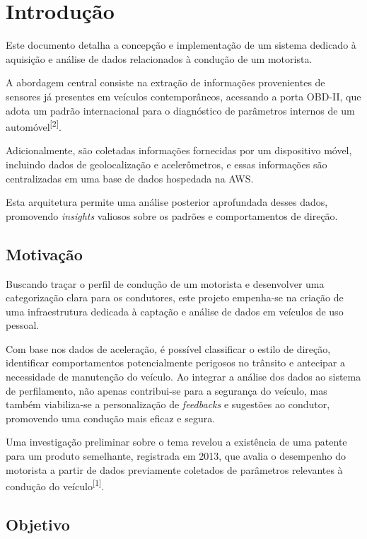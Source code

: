 \chapter{Introdução}\label{CAP:introducao}

Este documento detalha a concepção e implementação de um sistema dedicado à aquisição e análise de dados relacionados à condução de um motorista.

A abordagem central consiste na extração de informações provenientes de sensores já presentes em veículos contemporâneos, acessando a porta OBD-II, que adota um padrão internacional para o diagnóstico de parâmetros internos de um automóvel\textsuperscript{[2]}.

Adicionalmente, são coletadas informações fornecidas por um dispositivo móvel, incluindo dados de geolocalização e acelerômetros, e essas informações são centralizadas em uma base de dados hospedada na AWS. 

Esta arquitetura permite uma análise posterior aprofundada desses dados, promovendo \textit{insights} valiosos sobre os padrões e comportamentos de direção.

\section{Motivação}

Buscando traçar o perfil de condução de um motorista e desenvolver uma categorização clara para os condutores, este projeto empenha-se na criação de uma infraestrutura dedicada à captação e análise de dados em veículos de uso pessoal.

Com base nos dados de aceleração, é possível classificar o estilo de direção, identificar comportamentos potencialmente perigosos no trânsito e antecipar a necessidade de manutenção do veículo. Ao integrar a análise dos dados ao sistema de perfilamento, não apenas contribui-se para a segurança do veículo, mas também viabiliza-se a personalização de \textit{feedbacks} e sugestões ao condutor, promovendo uma condução mais eficaz e segura.

Uma investigação preliminar sobre o tema revelou a existência de uma patente para um produto semelhante, registrada em 2013, que avalia o desempenho do motorista a partir de dados previamente coletados de parâmetros relevantes à condução do veículo\textsuperscript{[1]}.


\section{Objetivo}

